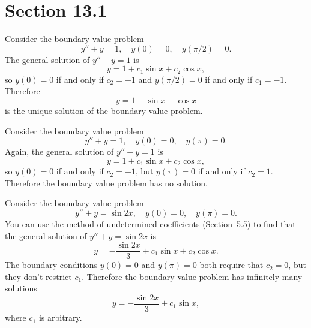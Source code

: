 \section*{Section 13.1}
{}
\setcounter{chapter}{13}
\setcounter{section}{1}

\setcounter{example}{0}
\begin{example}
  \label{example:13.1.1} \rm Consider the boundary value problem
  \[
    y''+y=1,\quad y(0)=0,\quad y(\pi/2)=0.
  \]
  The general solution of $y''+y=1$ is
  \[
    y=1+c_{1}\sin x+c_{2}\cos x,
  \]
  so $y(0)=0$ if and only if $c_{2}=-1$ and $y(\pi/2)=0$ if and only if $c_{1}=-1$. Therefore
  \[
    y=1-\sin x-\cos x
  \]
  is the unique solution of the boundary value problem.
\end{example}

\setcounter{example}{1}
\begin{example}
  \label{example:13.1.2} \rm Consider the boundary value problem
  \[
    y''+y=1,\quad y(0)=0,\quad y(\pi)=0.
  \]
  Again, the general solution of $y''+y=1$ is
  \[
    y=1+c_{1}\sin x+c_{2}\cos x,
  \]
  so $y(0)=0$ if and only if $c_{2}=-1$, but $y(\pi)=0$ if and only if $c_{2}=1$. Therefore the
  boundary value problem has no solution.
\end{example}

\setcounter{example}{2}
\begin{example}
  \label{example:13.1.3} \rm Consider the boundary value problem
  \[
    y''+y=\sin2x,\quad y(0)=0,\quad y(\pi)=0.
  \]
  You can use the method of undetermined coefficients (Section~5.5) to find that the general
  solution of $y''+y=\sin2x$ is
  \[
    y=-\frac{\sin2x}{3}+c_{1}\sin x+c_{2}\cos x.
  \]
  The boundary conditions $y(0)=0$ and $y(\pi)=0$ both require that $c_{2}=0$, but they don't
  restrict $c_{1}$. Therefore the boundary value problem has infinitely many solutions
  \[
    y=-\frac{\sin2x}{3}+c_{1}\sin x,
  \]
  where $c_{1}$ is arbitrary.
\end{example}

